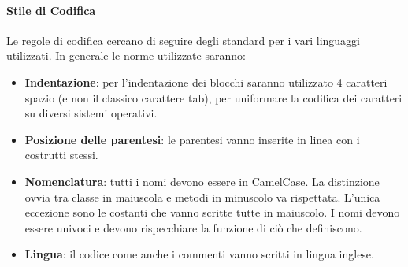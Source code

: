 \paragraph{Stile di Codifica}
Le regole di codifica cercano di seguire degli standard per i vari linguaggi utilizzati. In generale le norme utilizzate saranno:
\begin{itemize}
  \item \textbf{Indentazione}: per l'indentazione dei blocchi saranno utilizzato 4 caratteri spazio (e non il classico carattere tab), per uniformare la codifica dei caratteri su diversi sistemi operativi.
  \item \textbf{Posizione delle parentesi}: le parentesi vanno inserite in linea con i costrutti stessi.
  \item \textbf{Nomenclatura}: tutti i nomi devono essere in CamelCase. La distinzione ovvia tra classe in maiuscola e metodi in minuscolo va rispettata. L'unica eccezione sono le costanti che vanno scritte tutte in maiuscolo. I nomi devono essere univoci e devono rispecchiare la funzione di ciò che definiscono.
  \item \textbf{Lingua}: il codice come anche i commenti vanno scritti in lingua inglese.
\end{itemize}
